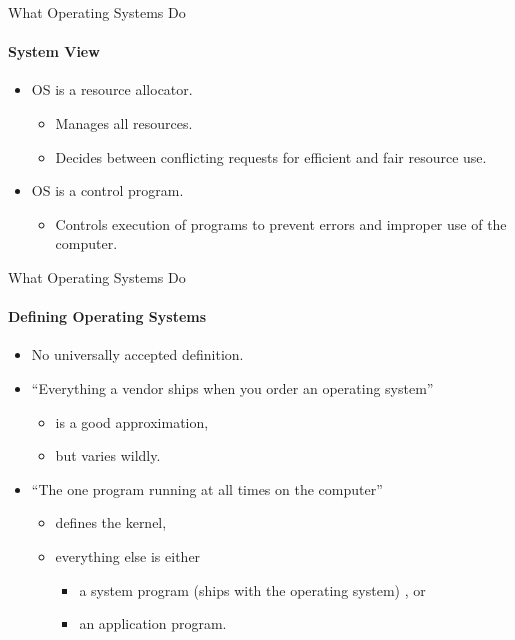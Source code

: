 \documentclass[10pt]{beamer}
\begin{document}
\begin{frame}{What Operating Systems Do}
\framesubtitle{System View}
\begin{itemize}
\item OS is a \alert{resource allocator}.
\begin{itemize}
\item Manages all resources.
\item Decides between conflicting requests for efficient and fair resource use.
\end{itemize}
\item OS is a \alert{control program}.
\begin{itemize}
\item Controls execution of programs to prevent errors and improper use of the computer.
\end{itemize}
\end{itemize}
\end{frame}

\begin{frame}{What Operating Systems Do}
\framesubtitle{Defining Operating Systems}
\begin{itemize}
\item \alert{No universally accepted definition}.
\item ``Everything a vendor ships when you order an operating system'' 
\begin{itemize}
\item is a good approximation,
\item but varies wildly.
\end{itemize}
\item ``The one program running at all times on the computer''
\begin{itemize}
\item defines the kernel,
\item everything else is either
\begin{itemize}
\item a system program (ships with the operating system) , or
\item an application program.
\end{itemize}
\end{itemize}
\end{itemize}
\end{frame}
\end{document}
